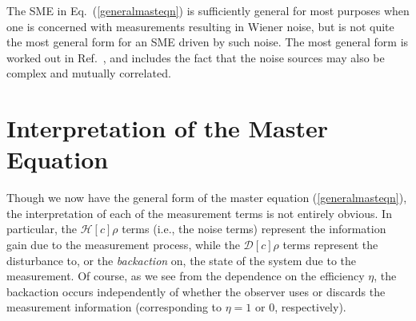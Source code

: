 \documentclass[aps,twocolumn,superscriptaddress,footinbib,floatfix,showpacs]{revtex4}
\begin{document}
The SME in Eq.~(\ref{generalmasteqn}) is sufficiently 
general for most purposes when one is concerned with measurements 
resulting in Wiener noise, but is not quite the most general form 
for an SME driven by such noise. The most general form 
is worked out in Ref.~\cite{Wiseman01}, and includes the fact 
that the noise sources may also be complex and mutually correlated.  


\section{Interpretation of the Master Equation}
\label{section:interpretation}

Though we now have the general form of the master equation (\ref{generalmasteqn}),
the interpretation of each of the measurement terms is not entirely obvious.
In particular, the 
$\mathcal{H}[c]\rho$ terms (i.e., the noise terms) represent the 
information gain due to the measurement process, while the
$\mathcal{D}[c]\rho$ terms represent the disturbance to, or 
the \textit{backaction} on,
the state of the system
due to the measurement.  Of course, as we see from the 
dependence on the efficiency $\eta$, the backaction occurs
independently of whether the observer uses or discards the
measurement information (corresponding to $\eta=1$ or $0$, respectively).
\end{document}
